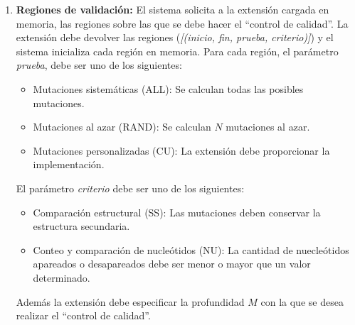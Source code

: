 \documentclass[10pt,a4paper]{article}
\begin{document}
\begin{enumerate}
    \item \textbf{Regiones de validaci\'on:}
    El sistema solicita a la extensi\'on cargada en memoria, las regiones sobre
las que se debe hacer el ``control de calidad''. La extensi\'on debe devolver
las regiones (\textit{[(inicio, fin, prueba, criterio)]}) y el sistema
inicializa cada regi\'on en memoria. Para cada regi\'on, el par\'ametro
\textit{prueba}, debe ser uno de los siguientes:
      \begin{itemize}
        \item Mutaciones sistem\'aticas (ALL): Se calculan todas las posibles
mutaciones.
	\item Mutaciones al azar (RAND): Se calculan $N$ mutaciones al azar.
	\item Mutaciones personalizadas (CU): La extensi\'on debe proporcionar
la implementaci\'on.
      \end{itemize}    
    El par\'ametro \textit{criterio} debe ser uno de los siguientes:
      \begin{itemize}
        \item Comparaci\'on estructural (SS): Las mutaciones deben conservar la
estructura secundaria.
	\item Conteo y comparaci\'on de nucle\'otidos (NU): La cantidad de
nuecle\'otidos apareados o desapareados debe ser menor o mayor que un valor
determinado.
      \end{itemize}
    
    Adem\'as la extensi\'on debe especificar la profundidad $M$ con la que se
desea realizar el ``control de calidad''.    
  \end{enumerate}
\end{document}
